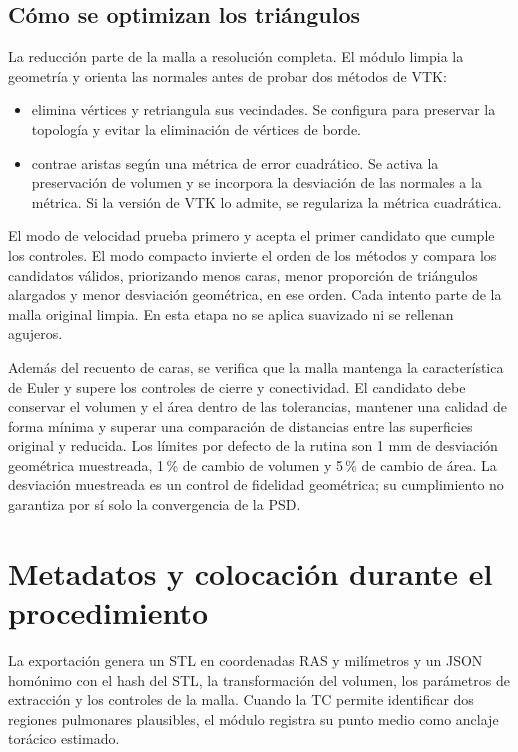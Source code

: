 \subsection{Cómo se optimizan los triángulos}
La reducción parte de la malla a resolución completa. El módulo limpia la geometría y orienta las normales antes de probar dos métodos de VTK:

\begin{itemize}
\item {} elimina vértices y retriangula sus vecindades. Se configura para preservar la topología y evitar la eliminación de vértices de borde.
\item {} contrae aristas según una métrica de error cuadrático. Se activa la preservación de volumen y se incorpora la desviación de las normales a la métrica. Si la versión de VTK lo admite, se regulariza la métrica cuadrática.
\end{itemize}

El modo de velocidad prueba primero  y acepta el primer candidato que cumple los controles. El modo compacto invierte el orden de los métodos y compara los candidatos válidos, priorizando menos caras, menor proporción de triángulos alargados y menor desviación geométrica, en ese orden. Cada intento parte de la malla original limpia. En esta etapa no se aplica suavizado ni se rellenan agujeros.

Además del recuento de caras, se verifica que la malla mantenga la característica de Euler y supere los controles de cierre y conectividad. El candidato debe conservar el volumen y el área dentro de las tolerancias, mantener una calidad de forma mínima y superar una comparación de distancias entre las superficies original y reducida. Los límites por defecto de la rutina son 1 mm de desviación geométrica muestreada, 1\,\% de cambio de volumen y 5\,\% de cambio de área. La desviación muestreada es un control de fidelidad geométrica; su cumplimiento no garantiza por sí solo la convergencia de la PSD.

\section{Metadatos y colocación durante el procedimiento}
La exportación genera un STL en coordenadas RAS y milímetros y un JSON homónimo con el hash del STL, la transformación del volumen, los parámetros de extracción y los controles de la malla. Cuando la TC permite identificar dos regiones pulmonares plausibles, el módulo registra su punto medio como anclaje torácico estimado.

